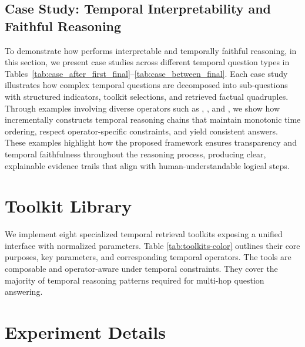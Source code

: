 \subsection{Case Study: Temporal Interpretability and Faithful Reasoning}
\label{sec:casestudy-temporal}
To demonstrate how \mot performs interpretable and temporally faithful reasoning,
in this section, we present case studies across different temporal question types in Tables~\ref{tab:case_after_first_final}--\ref{tab:case_between_final}.
Each case study illustrates how complex temporal questions are decomposed into sub-questions with structured indicators, toolkit selections, and retrieved factual quadruples. 
Through examples involving diverse operators such as , , and , we show how \mot incrementally constructs temporal reasoning chains that maintain monotonic time ordering, respect operator-specific constraints, and yield consistent answers. 
These examples highlight how the proposed framework ensures transparency and temporal faithfulness throughout the reasoning process, producing clear, explainable evidence trails that align with human-understandable logical steps.

\section{Toolkit Library}
\label{sec:toolkit}

We implement eight specialized temporal retrieval toolkits exposing a unified interface with normalized parameters.
Table \ref{tab:toolkits-color} outlines their core purposes, key parameters, and corresponding temporal operators. 
The tools are composable and operator-aware under temporal constraints. They cover the majority of temporal reasoning patterns required for multi-hop question answering.






\section{Experiment Details}
\label{appen:dataset_details}


